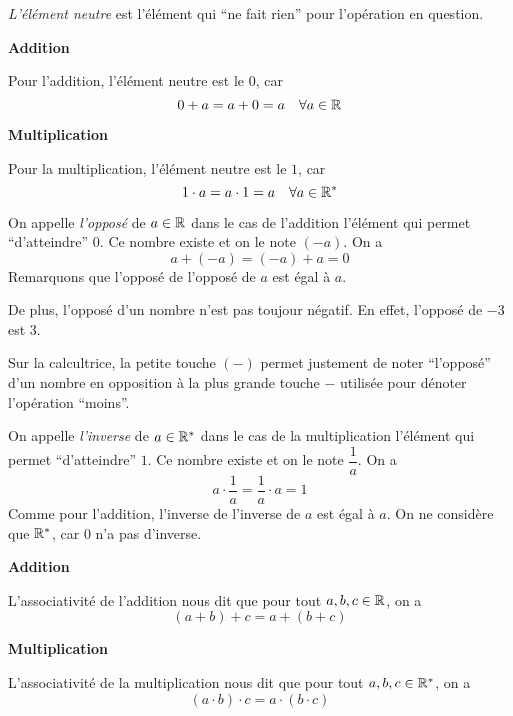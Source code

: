 \documentclass[a4paper,12pt]{report}
\begin{document}
\begin{description}[leftmargin= 2cm]
	\item[] 
		\emph{L'élément neutre} est l'élément qui \enquote{ne fait rien} pour l'opération en question.

		\begin{minipage}[t]{0.4\textwidth}{
		\vspace{0pt}
		{\bfseries Addition}

		Pour l'addition, l'élément neutre est le $0$, car
		\[0+a=a+0=a \quad \forall a\in \mathbb R\]
		}
		\end{minipage}
		\hfill
		\begin{minipage}[t]{0.4\textwidth}{
		\vspace{0pt}
		{\bfseries Multiplication}

		Pour la multiplication, l'élément neutre est le $1$, car
		\[1\cdot a=a\cdot 1=a \quad \forall a\in \mathbb R^*\]
		}
		\end{minipage}
	\item[]
		On appelle \emph{l'opposé} de $a\in \mathbb R$ dans le cas de l'addition l'élément qui permet \enquote{d'atteindre} $0$. Ce nombre existe et on le note $(-a)$. On a  
		\[a+(-a)=(-a)+a=0\]
		Remarquons que l'opposé de l'opposé de $a$ est égal à $a$. 

		De plus, l'opposé d'un nombre n'est pas toujour négatif. En effet, l'opposé de $-3$ est $3$.

		Sur la calcultrice, la petite touche $(-)$ permet justement de noter \enquote{l'opposé} d'un nombre en opposition à la plus grande touche $-$ utilisée pour dénoter l'opération \enquote{moins}.
	\item[]
		On appelle \emph{l'inverse} de $a\in \mathbb R^*$ dans le cas de la multiplication l'élément qui permet \enquote{d'atteindre} $1$. Ce nombre existe et on le note $\dfrac{1}{a}$. On a 
		\[a\cdot \dfrac{1}{a}=\dfrac{1}{a}\cdot a=1\]
		Comme pour l'addition, l'inverse de l'inverse de $a$ est égal à $a$. On ne considère que $\mathbb R^*$, car $0$ n'a pas d'inverse.
	\item[Associativité]

		\begin{minipage}[t]{0.4\textwidth}{
		\vspace{0pt}
		{\bfseries Addition}

		L'associativité de l'addition nous dit que pour tout $a,b,c\in \mathbb R$, on a 
		\[(a+b)+c=a+(b+c)\]
				}
		\end{minipage}
		\hfill
		\begin{minipage}[t]{0.4\textwidth}{
		\vspace{0pt}
		{\bfseries Multiplication}

	L'associativité de la multiplication nous dit que pour tout $a,b,c\in \mathbb R^*$, on a 
	\[(a\cdot b)\cdot c=a\cdot(b\cdot c)\]
		}
		\end{minipage}
	\item[Commutativité]


\end{description}
\end{document}
